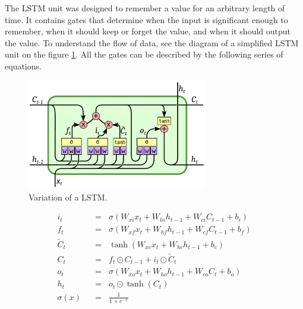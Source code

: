 The LSTM unit was designed to remember a value for an arbitrary length of time. It contains gates that determine when the input is significant enough to remember, when it should keep or forget the value, and when it should output the value. To understand the flow of data, see the diagram of a simplified LSTM unit on the figure \ref{fig:lstm}. All the gates can be described by the following series of equations.

\begin{figure}[!t]
	\centering
	\includegraphics[width=0.7\textwidth]{./fig/lstm-peepholes.pdf}
	\caption{Variation of a LSTM.
		\label{fig:lstm}}
\end{figure}

\belowdisplayskip=24pt
\begin{align}
	i_t \hspace{7pt}&=\hspace{7pt} \sigma(W_{xi}x_t + W_{hi}h_{t-1} + W_{ci}C_{t-1} + b_i) \label{eq:lstm1}\\
	f_t \hspace{7pt}&=\hspace{7pt} \sigma(W_{xf}x_t + W_{hf}h_{t-1} + W_{cf}C_{t-1} + b_f) \label{eq:lstm2}\\
	\widetilde{C}_t\hspace{7pt}&=\hspace{7pt} \tanh(W_{xc}x_t + W_{hc}h_{t-1} + b_c) \label{eq:lstm3}\\
	C_t \hspace{7pt}&=\hspace{7pt} f_t\odot C_{t-1} + i_t\odot \widetilde{C}_t \label{eq:lstm4}\\
	o_t \hspace{7pt}&=\hspace{7pt} \sigma(W_{xo}x_t + W_{ho}h_{t-1} + W_{co}C_t + b_o) \label{eq:lstm5}\\
	h_t \hspace{7pt}&=\hspace{7pt} o_t\odot \tanh(C_t) \label{eq:lstm6}\\[16pt]
	\sigma(x) \hspace{7pt}&=\hspace{7pt} \frac{1}{1+e^{-x}} \label{eq:lstm7}
\end{align}

